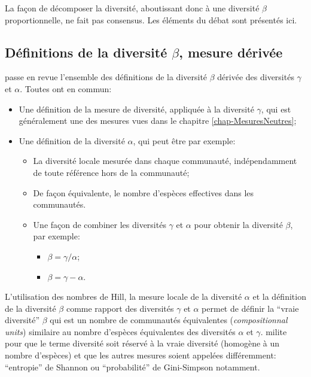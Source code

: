 \documentclass[
  11pt,
  french,
  a4paper,
  extrafontsizes,onecolumn,openright
  ]{memoir}
\providecommand{\tightlist}{%
  \setlength{\itemsep}{0pt}\setlength{\parskip}{0pt}}
\begin{document}
La façon de décomposer la diversité, aboutissant donc à une diversité \(\beta\) proportionnelle, ne fait pas consensus.
Les éléments du débat sont présentés ici.

\subsection{\texorpdfstring{Définitions de la diversité \(\beta\), mesure dérivée}{Définitions de la diversité \textbackslash beta, mesure dérivée}}\label{duxe9finitions-de-la-diversituxe9-beta-mesure-duxe9rivuxe9e}

\textcite{Tuomisto2010a} passe en revue l'ensemble des définitions de la diversité \(\beta\) dérivée des diversités \(\gamma\) et \(\alpha\).
Toutes ont en commun:

\begin{itemize}
\tightlist
\item
  Une définition de la mesure de diversité, appliquée à la diversité \(\gamma\), qui est généralement une des mesures vues dans le chapitre \ref{chap-MesuresNeutres};
\item
  Une définition de la diversité \(\alpha\), qui peut être par exemple:

  \begin{itemize}
  \tightlist
  \item
    La diversité locale mesurée dans chaque communauté, indépendamment de toute référence hors de la communauté;
  \item
    De façon équivalente, le nombre d'espèces effectives dans les communautés.
  \item
    Une façon de combiner les diversités \(\gamma\) et \(\alpha\) pour obtenir la diversité \(\beta\), par exemple:

    \begin{itemize}
    \tightlist
    \item
      \(\beta={\gamma}/{\alpha}\);
    \item
      \(\beta=\gamma-\alpha\).
    \end{itemize}
  \end{itemize}
\end{itemize}

L'utilisation des nombres de Hill, la mesure locale de la diversité \(\alpha\) et la définition de la diversité \(\beta\) comme rapport des diversités \(\gamma\) et \(\alpha\) permet de définir la ``vraie diversité'' \autocite{Jost2006,Jost2007} \(\beta\) qui est un nombre de communautés équivalentes (\emph{compositionnal units}) similaire au nombre d'espèces équivalentes des diversités \(\alpha\) et \(\gamma\).
\textcite{Tuomisto2011} milite pour que le terme diversité soit réservé à la vraie diversité (homogène à un nombre d'espèces) et que les autres mesures soient appelées différemment: ``entropie'' de Shannon ou ``probabilité'' de Gini-Simpson notamment.
\end{document}
